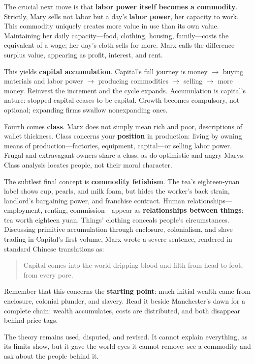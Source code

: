 The crucial next move is that \textbf{labor power itself becomes a commodity}. Strictly, Mary sells not labor but a day's \textbf{labor power}, her capacity to work. This commodity uniquely creates more value in use than its own value. Maintaining her daily capacity---food, clothing, housing, family---costs the equivalent of a wage; her day's cloth sells for more. Marx calls the difference surplus value, appearing as profit, interest, and rent.

This yields \textbf{capital accumulation}. Capital's full journey is money $\rightarrow$ buying materials and labor power $\rightarrow$ producing commodities $\rightarrow$ selling $\rightarrow$ more money. Reinvest the increment and the cycle expands. Accumulation is capital's nature: stopped capital ceases to be capital. Growth becomes compulsory, not optional; expanding firms swallow nonexpanding ones.

Fourth comes \textbf{class}. Marx does not simply mean rich and poor, descriptions of wallet thickness. Class concerns your \textbf{position} in production: living by owning means of production---factories, equipment, capital---or selling labor power. Frugal and extravagant owners share a class, as do optimistic and angry Marys. Class analysis locates people, not their moral character.

The subtlest final concept is \textbf{commodity fetishism}. The tea's eighteen-yuan label shows cup, pearls, and milk foam, but hides the worker's back strain, landlord's bargaining power, and franchise contract. Human relationships---employment, renting, commission---appear as \textbf{relationships between things}: tea worth eighteen yuan. Things' clothing conceals people's circumstances. Discussing primitive accumulation through enclosure, colonialism, and slave trading in Capital's first volume, Marx wrote a severe sentence, rendered in standard Chinese translations as:

\begin{quote}
Capital comes into the world dripping blood and filth from head to foot, from every pore.
\end{quote}
Remember that this concerns the \textbf{starting point}: much initial wealth came from enclosure, colonial plunder, and slavery. Read it beside Manchester's dawn for a complete chain: wealth accumulates, costs are distributed, and both disappear behind price tags.

The theory remains used, disputed, and revised. It cannot explain everything, as its limits show, but it gave the world eyes it cannot remove: see a commodity and ask about the people behind it.

